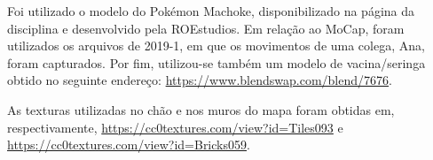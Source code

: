 Foi utilizado o modelo do Pokémon Machoke, disponibilizado na página da disciplina e desenvolvido pela ROEstudios. Em relação ao MoCap, foram utilizados os arquivos de 2019-1, em que os movimentos de uma colega, Ana, foram capturados. Por fim, utilizou-se também um modelo de vacina/seringa obtido no seguinte endereço: \url{https://www.blendswap.com/blend/7676}.

As texturas utilizadas no chão e nos muros do mapa foram obtidas em, respectivamente, \url{https://cc0textures.com/view?id=Tiles093} e \url{https://cc0textures.com/view?id=Bricks059}.